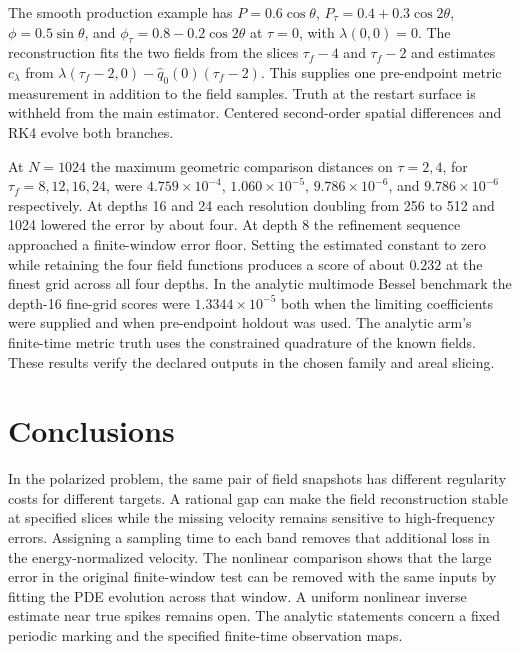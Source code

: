 The smooth production example has
$P=0.6\cos\theta$, $P_\tau=0.4+0.3\cos 2\theta$,
$\phi=0.5\sin\theta$, and $\phi_\tau=0.8-0.2\cos 2\theta$
at $\tau=0$, with $\lambda(0,0)=0$.
The reconstruction fits the two fields from the slices
$\tau_f-4$ and $\tau_f-2$ and estimates
$c_\lambda$ from $\lambda(\tau_f-2,0)-\widehat q_0(0)(\tau_f-2)$.
This supplies one pre-endpoint metric measurement in addition to
the field samples. Truth at the restart surface is withheld
from the main estimator. Centered second-order spatial differences
and RK4 evolve both branches.

At $N=1024$ the maximum geometric comparison distances on
$\tau=2,4$, for $\tau_f=8,12,16,24$, were
$4.759\times10^{-4}$, $1.060\times10^{-5}$,
$9.786\times10^{-6}$, and $9.786\times10^{-6}$ respectively.
At depths 16 and 24 each resolution doubling from 256 to 512 and
1024 lowered the error by about four. At depth 8 the refinement
sequence approached a finite-window error floor. Setting the estimated
constant to zero while retaining the four field functions produces
a score of about $0.232$ at the finest grid across all four depths.
In the analytic multimode Bessel benchmark the depth-16 fine-grid
scores were $1.3344\times10^{-5}$ both when the limiting coefficients
were supplied and when pre-endpoint holdout was used. The analytic
arm's finite-time metric truth uses the constrained quadrature of
the known fields. These results verify the declared outputs in the
chosen family and areal slicing.



\section{Conclusions}
In the polarized problem, the same pair of field snapshots has
different regularity costs for different targets. A rational gap can
make the field reconstruction stable at specified slices while the
missing velocity remains sensitive to high-frequency errors.
Assigning a sampling time to each band removes that additional
loss in the energy-normalized velocity.
The nonlinear comparison shows that the large error in the
original finite-window test can be removed with the same inputs
by fitting the PDE evolution across that window.
A uniform nonlinear inverse estimate near true spikes remains
open. The analytic statements concern a fixed periodic marking and
the specified finite-time observation maps.

\appendix
